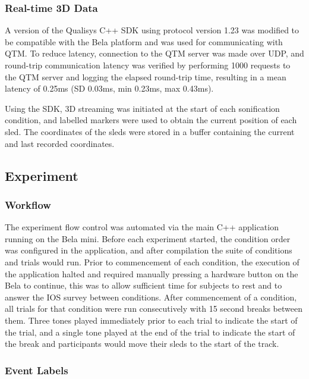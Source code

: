 \documentclass[10pt,a4paper,onecolumn]{article}
\begin{document}
\hypertarget{real-time-3d-data}{%
\subsubsection{Real-time 3D Data}\label{real-time-3d-data}}

A version of the Qualisys C++ SDK using protocol version 1.23 was modified to be compatible with the Bela platform and was used for communicating with QTM. To reduce latency, connection to the QTM server was made over UDP, and round-trip communication latency was verified by performing 1000 requests to the QTM server and logging the elapsed round-trip time, resulting in a mean latency of 0.25ms (SD 0.03ms, min 0.23ms, max 0.43ms).

Using the SDK, 3D streaming was initiated at the start of each sonification condition, and labelled markers were used to obtain the current position of each sled. The coordinates of the sleds were stored in a buffer containing the current and last recorded coordinates.

\hypertarget{experiment}{%
\subsection{Experiment}\label{experiment}}

\hypertarget{workflow}{%
\subsubsection{Workflow}\label{workflow}}

The experiment flow control was automated via the main C++ application running on the Bela mini. Before each experiment started, the condition order was configured in the application, and after compilation the suite of conditions and trials would run. Prior to commencement of each condition, the execution of the application halted and required manually pressing a hardware button on the Bela to continue, this was to allow sufficient time for subjects to rest and to answer the IOS survey between conditions. After commencement of a condition, all trials for that condition were run consecutively with 15 second breaks between them. Three tones played immediately prior to each trial to indicate the start of the trial, and a single tone played at the end of the trial to indicate the start of the break and participants would move their sleds to the start of the track.

\hypertarget{event-labels}{%
\subsubsection{Event Labels}\label{event-labels}}
\end{document}
